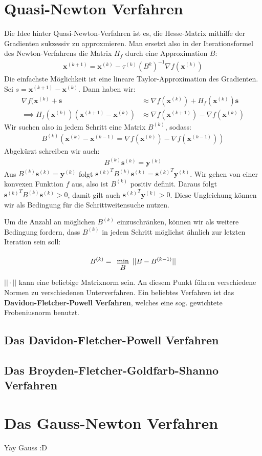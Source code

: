 \documentclass{report}
\newcommand{\tbf}{\textbf}
\renewcommand{\min}[1] {
    \begin{array}{c}
        \vphantom{#1}\\[-3pt] %
        \text{min}\\[-3pt]
        #1\\
        \end{array}
    }
\newcommand{\xk}{\bm{x}^{(k)}}
\newcommand{\yk}{\bm{y}^{(k)}}
\newcommand{\sk}{\bm{s}^{(k)}}
\newcommand{\tauk}{\tau^{(k)}}
\newcommand{\Bk}{B^{(k)}}
\newcommand*{\newpar}{\par\vspace{\baselineskip}\noindent}
\begin{document}
\section{Quasi-Newton Verfahren}
Die Idee hinter Quasi-Newton-Verfahren ist es, die Hesse-Matrix mithilfe der Gradienten sukzessiv zu approxmieren. Man ersetzt also in der Iterationsformel des Newton-Verfahrens die Matrix $H_f$ durch eine Approximation $B$:
\begin{align*}
 \bm{x}^{(k+1)} = \xk - \tauk (B^k)^{-1} \nabla f(\xk)
\end{align*}
Die einfachste Möglichkeit ist eine lineare Taylor-Approximation des Gradienten. Sei $s = \bm{x}^{(k+1)} - \xk$. Dann haben wir:
\begin{align*}
 \nabla f(\xk + \bm{s} &\approx \nabla f(\xk) + H_f(\xk)\bm{s}\\
 \implies H_f(\xk)(\bm{x}^{(k+1)} - \xk) &\approx \nabla f(\bm{x}^{(k+1)}) - \nabla f(\xk)
\end{align*}
Wir suchen also in jedem Schritt eine Matrix $\Bk$, sodass:
\begin{align}
 \Bk (\xk - \bm{x}^{(k-1)} = \nabla f(\xk) - \nabla f(\bm{x}^{(k-1)}))
\end{align}
Abgekürzt schreiben wir auch:
\begin{align*}
 \Bk \sk = \yk
\end{align*}
Aus $\Bk \sk = \yk$ folgt ${\sk}^T\Bk \sk = {\sk}^T\yk$. Wir gehen von einer konvexen Funktion $f$ aus, also ist $\Bk$ positiv definit. Daraus folgt ${\sk}^T\Bk \sk > 0$, damit gilt auch ${\sk}^T\yk > 0$. Diese Ungleichung können wir als Bedingung für die Schrittweitensuche nutzen.
\newpar
Um die Anzahl an möglichen $\Bk$ einzuschränken, können wir als weitere Bedingung fordern, dass $\Bk$ in jedem Schritt möglichst ähnlich zur letzten Iteration sein soll:
\begin{align*}
 \Bk = \min{B} ||B - B^{(k-1)}||
\end{align*}
$||\cdot||$ kann eine beliebige Matrixnorm sein. An diesem Punkt führen verschiedene Normen zu verschiedenen Unterverfahren. Ein beliebtes Verfahren ist das \tbf{Davidon-Fletcher-Powell Verfahren}, welches eine sog. gewichtete Frobeniusnorm benutzt.
\subsection{Das Davidon-Fletcher-Powell Verfahren}
\subsection{Das Broyden-Fletcher-Goldfarb-Shanno Verfahren}
\section{Das Gauss-Newton Verfahren}
Yay Gauss :D
\end{document}
